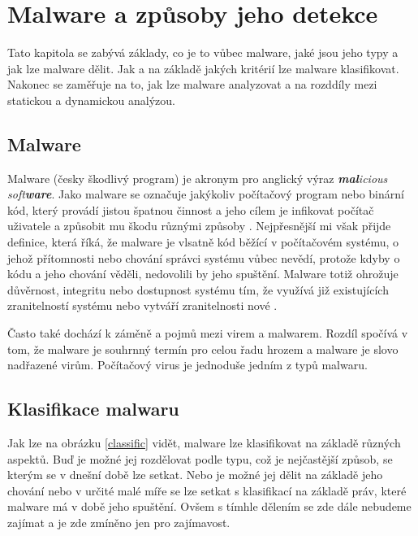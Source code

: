 \chapter{Malware a způsoby jeho detekce} \label{2.chap}

Tato kapitola se zabývá základy, co je to vůbec malware, jaké jsou jeho typy a jak lze malware dělit. Jak a na základě jakých kritérií lze malware klasifikovat.
Nakonec se zaměřuje na to, jak lze malware analyzovat a na rozddíly mezi statickou a dynamickou analýzou. 


\section{Malware}
Malware (česky škodlivý program) je akronym pro anglický výraz \textit{\textbf{mal}icious soft\textbf{ware}}. Jako malware se označuje jakýkoliv počítačový program nebo binární kód, který provádí jistou 
špatnou činnost a jeho cílem je infikovat počítač uživatele a způsobit mu škodu různými způsoby \cite{malware_book}. %
Nejpřesnější mi však přijde definice, která říká, že malware je vlsatně kód běžící v počítačovém systému, o jehož přítomnosti nebo chování správci systému vůbec nevědí, protože kdyby o kódu a jeho chování věděli, nedovolili by jeho spuštění.
Malware totiž ohrožuje důvěrnost, integritu nebo dostupnost systému tím, že využívá již existujících zranitelností systému nebo vytváří zranitelnosti nové \cite{article_malware}.%

Často také dochází k záměně a pojmů mezi virem a malwarem. Rozdíl spočívá v tom, že malware je souhrnný termín pro celou řadu hrozem a malware je slovo nadřazené virům. Počítačový virus je jednoduše jedním z typů malwaru.

\section{Klasifikace malwaru}
Jak lze na obrázku \ref{classific} vidět, malware lze klasifikovat na základě různých aspektů. Buď je možné jej rozdělovat podle typu, což je nejčastější způsob, se kterým se v dnešní době lze setkat. Nebo je možné 
jej dělit na základě jeho chování nebo v určité malé míře se lze setkat s klasifikací na základě práv, které malware má v době jeho spuštění. Ovšem s tímhle dělením se zde dále nebudeme zajímat a je zde zmíněno jen pro zajímavost.

